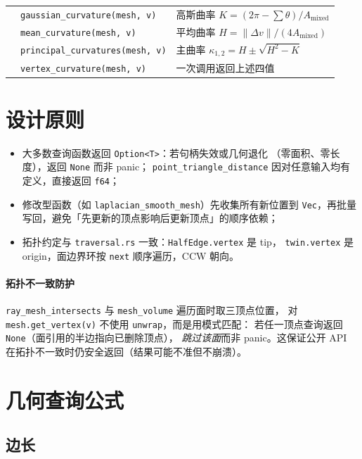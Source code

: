 \documentclass[11pt,a4paper]{article}
\begin{document}
\begin{center}
\begin{tabular}{@{}lll@{}}
    & \texttt{gaussian\_curvature(mesh, v)}           & 高斯曲率 $K = (2\pi - \sum\theta)/A_\text{mixed}$ \\
    & \texttt{mean\_curvature(mesh, v)}               & 平均曲率 $H = \|\Delta v\|/(4 A_\text{mixed})$ \\
    & \texttt{principal\_curvatures(mesh, v)}         & 主曲率 $\kappa_{1,2} = H \pm \sqrt{H^2-K}$ \\
    & \texttt{vertex\_curvature(mesh, v)}             & 一次调用返回上述四值 \\
  \bottomrule
\end{tabular}
\end{center}

\section{设计原则}

\begin{itemize}
  \item 大多数查询函数返回 \texttt{Option<T>}：若句柄失效或几何退化
        （零面积、零长度），返回 \texttt{None} 而非 panic；
        \texttt{point\_triangle\_distance} 因对任意输入均有定义，直接返回 \texttt{f64}；
  \item 修改型函数（如 \texttt{laplacian\_smooth\_mesh}）先收集所有新位置到
        \texttt{Vec}，再批量写回，避免「先更新的顶点影响后更新顶点」的顺序依赖；
  \item 拓扑约定与 \texttt{traversal.rs} 一致：\texttt{HalfEdge.vertex} 是 tip，
        \texttt{twin.vertex} 是 origin，面边界环按 \texttt{next} 顺序遍历，CCW 朝向。
\end{itemize}

\paragraph{拓扑不一致防护}
\texttt{ray\_mesh\_intersects} 与 \texttt{mesh\_volume} 遍历面时取三顶点位置，
对 \texttt{mesh.get\_vertex(v)} 不使用 \texttt{unwrap}，而是用模式匹配：
若任一顶点查询返回 \texttt{None}（面引用的半边指向已删除顶点），
\emph{跳过该面}而非 panic。这保证公开 API 在拓扑不一致时仍安全返回（结果可能不准但不崩溃）。

\section{几何查询公式}

\subsection{边长}
\end{document}
